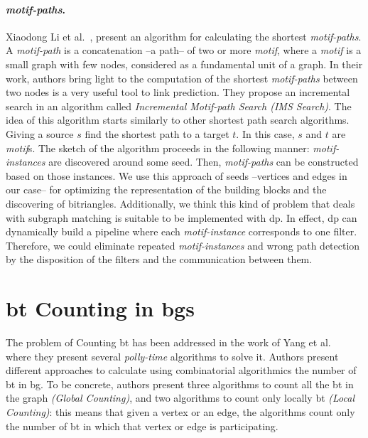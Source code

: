 \paragraph{\emph{motif-paths}.} Xiaodong Li et al.~\cite{Li2019MotifPA}, present an algorithm for calculating the shortest \emph{motif-paths}.
A \emph{motif-path} is a concatenation --a path--  of two or more \emph{motif}, where a \emph{motif} is a small graph with few nodes, considered as a fundamental unit of a graph.
In their work, authors bring light to the computation of the shortest \emph{motif-paths} between two nodes is a very useful tool to link prediction. They propose an incremental search in an algorithm called \emph{Incremental Motif-path Search (IMS Search)}.
The idea of this algorithm starts similarly to other shortest path search algorithms. Giving a source $s$ find the shortest path to a target $t$. In this case, $s$ and $t$ are \emph{motif}s.
The sketch of the algorithm proceeds in the following manner: \emph{motif-instances} are discovered around some seed. Then, \emph{motif-paths} can be constructed based on those instances. 
We use this approach of seeds --vertices and edges in our case-- for optimizing the representation of the building blocks and the discovering of bitriangles. 
Additionally, we think this kind of problem that deals with subgraph matching is suitable to be implemented with \acrlong{dp}. 
In effect, \acrshort{dp} can dynamically build a pipeline where each \emph{motif-instance} corresponds to one filter. 
Therefore, we could eliminate repeated \emph{motif-instances} and wrong path detection by the disposition of the filters and the communication between them.

\section{\acrlong{bt} Counting in \acrlong{bg}s}\label{sec:rel-work:counting}
The problem of Counting \acrshort{bt} has been addressed in the work of Yang et al.~\cite{btcount} where they present several \emph{polly-time} algorithms to solve it.
Authors present different approaches to calculate using  combinatorial algorithmics the number of \acrshort{bt} in \acrshort{bg}. 
To be concrete, authors present three algorithms to count all the \acrshort{bt} in the graph \emph{(Global Counting)}, and two algorithms to count only locally \acrshort{bt} \emph{(Local Counting)}: this means that given a vertex or an edge, the algorithms count only the number of \acrshort{bt} in which 
that vertex or edge is participating.

